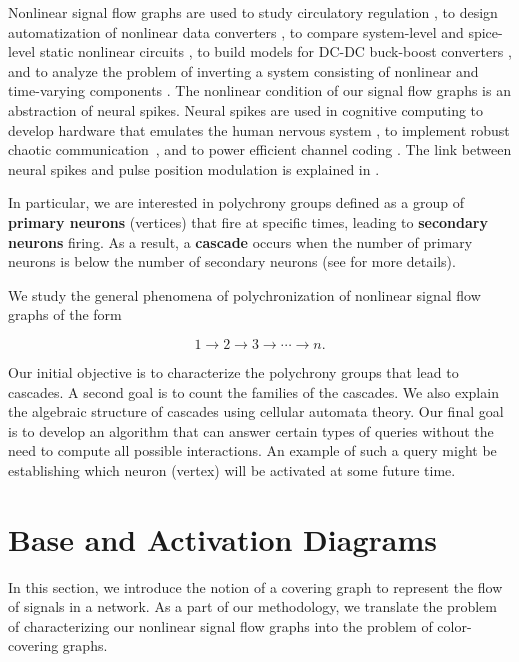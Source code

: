\documentclass[a4paper]{article}\usepackage[english]{babel}
\theoremstyle{definition}
\renewcommand{\emph}[1]{\textbf{#1}}
\begin{document}
Nonlinear signal flow graphs are used to study circulatory regulation \cite{hearth}, to design automatization of nonlinear data converters \cite{symb}, to compare system-level and spice-level static nonlinear circuits \cite{nonlinearsfg}, to build models for DC-DC buck-boost converters \cite{twolinears}, and to analyze the problem of inverting a system consisting of nonlinear and time-varying components \cite{inv}. The nonlinear condition of our signal flow graphs is an abstraction of neural spikes. Neural spikes are used in cognitive computing to develop hardware that emulates the human nervous system \cite{spikebased, slow, neuromorphic, neurosystems, pneurosystems}, to implement robust chaotic communication~\cite{chaos}, and to power efficient channel coding \cite{pulse}. The link between neural spikes and pulse position modulation is explained in \cite{leaky}. 

In particular, we are interested in polychrony groups defined as a group of \emph{{primary neurons}} (vertices) that fire at specific times, leading to \emph{secondary neurons} firing. As a result, a \emph{cascade} occurs when the number of primary neurons is below the number of secondary neurons (see \cite{izhikevich2006polychronization} for more details). 

We study the general phenomena of polychronization of nonlinear signal flow graphs of the form 

 \begin{equation*}
 1\rightarrow 2\rightarrow 3\rightarrow\cdots \rightarrow n.
\end{equation*}
 
Our initial objective is to characterize the polychrony groups that lead to cascades. A second goal is to count the families of the cascades.  We also explain the algebraic structure of cascades using cellular automata theory. Our final goal is to develop an algorithm that can answer certain types of queries without the need to compute all possible interactions. An example of such a query might be establishing which neuron (vertex) will be activated at some future time. 


\section{Base and Activation Diagrams}\label{sec:base-activation}

In this section, we introduce the notion of a covering graph to represent the flow of signals in a network. As a part of our methodology, we translate the problem of characterizing our nonlinear signal flow graphs into the problem of color-covering graphs. 
\end{document}
